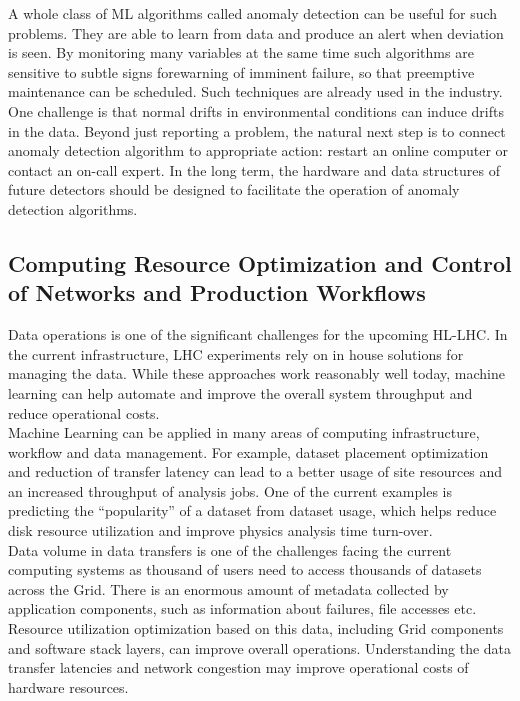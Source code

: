 A whole class of ML algorithms called anomaly detection can be useful for such problems. They are able to learn from data and produce an alert when deviation is seen. By monitoring many variables at the same time such algorithms are sensitive to subtle signs forewarning of imminent failure, so that preemptive maintenance can be scheduled. Such techniques are already used in the industry.\\

One challenge is that normal drifts in environmental conditions can induce drifts in the data. Beyond just reporting a problem, the natural next step is to connect anomaly detection algorithm to appropriate action: restart an online computer or contact an on-call expert. In the long term, the hardware and data structures of future detectors should be designed to facilitate the operation of anomaly detection algorithms.

\subsection{Computing Resource Optimization and Control of Networks and Production Workflows}\label{sec:resource-optimization}

Data operations is one of the significant challenges for the upcoming HL-LHC. In the current infrastructure, LHC experiments rely on in house solutions for managing the data. While these approaches work reasonably well today, machine learning can help automate and improve the overall system throughput and reduce operational costs.\\

Machine Learning can be applied in many areas of computing infrastructure, workflow and data management. For example, dataset placement optimization and reduction of transfer latency can lead to a better usage of site resources and an increased throughput of analysis jobs. One of the current examples is predicting the ``popularity'' of a dataset from dataset usage, which helps reduce disk resource utilization and improve physics analysis time turn-over.\\

Data volume in data transfers is one of the challenges facing the current computing systems as thousand of users need to access thousands of datasets across the Grid. There is an enormous amount of metadata collected by application components, such as information about failures, file accesses etc. Resource utilization optimization based on this data, including Grid components and software stack layers, can improve overall operations. Understanding the data transfer latencies and network congestion may improve operational costs of hardware resources.\\


